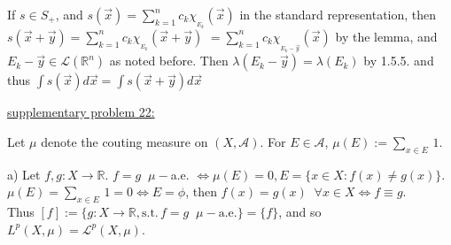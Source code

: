 \documentclass[12pt]{article}
\newcommand{\reals}[0] { \mathbb{R}}
\begin{document}
\begin{flushleft}
If $s \in S_+$, and $s(\vec{x}) = \sum_{k=1}^n c_k \chi_{_{E_k}}(\vec{x})$ in the standard representation, then $s(\vec{x}+ \vec{y}) = \sum_{k=1}^n c_k \chi_{_{E_k}}(\vec{x} + \vec{y})$ $ =\sum_{k=1}^n c_k \chi_{_{E_k-\vec{y}}}(\vec{x})$ by the lemma, and $E_k-\vec{y} \in \mathcal{L}(\reals^n)$ as noted before. Then $ \lambda (E_k-\vec{y}) = \lambda (E_k)$ by 1.5.5. and thus $ \int s(\vec{x}) d\vec{x} =  \int s(\vec{x}+\vec{y}) d\vec{x}$
\end{flushleft}

\begin{flushleft}
\underline{supplementary problem 22:}
\end{flushleft}

\begin{flushleft}
Let $\mu$ denote the couting measure on $(X,\mathcal{A})$. For $E \in \mathcal{A}$, $\mu(E) := \sum_{x \in E} \, 1$.
\end{flushleft}

\begin{flushleft}
a) Let $f,g :X \rightarrow \reals$. $f=g \; \;  \mu -$a.e. $\Leftrightarrow \mu{ (E) } = 0, E= \{x \in X: f(x) \not = g(x) \}$. $\mu(E) = \sum_{x \in E} \, 1 = 0 \Leftrightarrow E = \phi$, then $f(x) = g(x) \; \; \forall x \in X \Leftrightarrow f \equiv g$.\\
Thus $[f] := \{ g:X \rightarrow \reals, \textrm{s.t.} \, f=g \; \;  \mu - \textrm{a.e.} \} = \{ f \}$, and so $L^p(X,\mu) = \mathcal {L}^p(X,\mu)$.
\end{flushleft}
\end{document}
